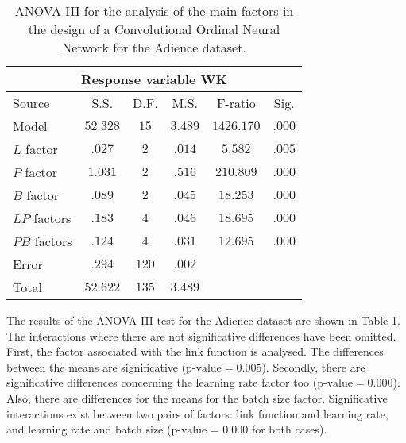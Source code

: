 \documentclass[10pt, a4paper, titlepage, twocolumn]{article}
\begin{document}
	\begin{table}[ht]
		\centering
		\small
		\begin{tabular}{l|ccccc}
			\multicolumn{6}{c}{Response variable WK}\\\hline
			Source & S.S. & D.F. & M.S. & F-ratio & Sig.\\\hline
			Model & $52.328$ & $15$ & $3.489$ & $1426.170$ & $.000$\\
			$L$ factor & $.027$ & $2$ & $.014$ & $5.582$ & $.005$\\
			$P$ factor & $1.031$ & $2$ & $.516$ & $210.809$ & $.000$\\
			$B$ factor & $.089$ & $2$ & $.045$ & $18.253$ & $.000$\\
			$LP$ factors & $.183$ & $4$ & $.046$ & $18.695$ & $.000$\\
			$PB$ factors & $.124$ & $4$ & $.031$ & $12.695$ & $.000$\\
			Error & $.294$ & $120$ & $.002$ & & \\
			Total & $52.622$ & $135$ & $3.489$ & & 
		\end{tabular}
		\caption{ANOVA III for the analysis of the main factors in the design of a Convolutional Ordinal Neural Network for the Adience dataset.}
		\label{table:ANOVAAdience}
	\end{table}
	
	The results of the ANOVA III test for the Adience dataset are shown in Table \ref{table:ANOVAAdience}. The interactions where there are not significative differences have been omitted. First, the factor associated with the link function is analysed. The differences between the means are significative ($\text{p-value} = 0.005$). Secondly, there are significative differences concerning the learning rate factor too ($\text{p-value} = 0.000$). Also, there are differences for the means for the batch size factor. Significative interactions exist between two pairs of factors: link function and learning rate, and learning rate and batch size ($\text{p-value = 0.000}$ for both cases).
	
\end{document}
